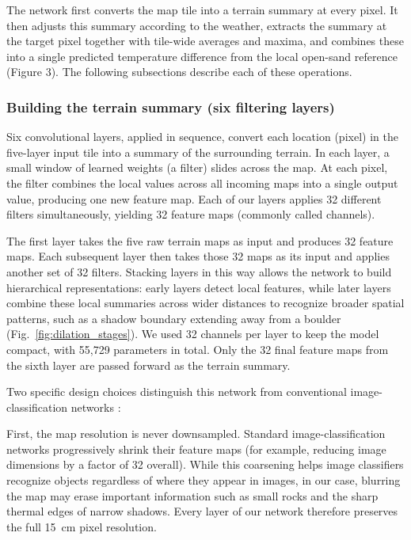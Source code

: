 \documentclass[12pt]{article}
\begin{document}
The network first converts the map tile into a terrain summary at every pixel. It then adjusts this summary according to the weather, extracts the summary at the target pixel together with tile-wide averages and maxima, and combines these into a single predicted temperature difference from the local open-sand reference (Figure 3). The following subsections describe each of these operations.



\subsubsection{Building the terrain summary (six filtering layers)}
\noindent Six convolutional layers, applied in sequence, convert each location (pixel) in the five-layer input tile into a summary of the surrounding terrain. In each layer, a small window of learned weights (a filter) slides across the map. At each pixel, the filter combines the local values across all incoming maps into a single output value, producing one new feature map. Each of our layers applies 32 different filters simultaneously, yielding 32 feature maps (commonly called channels).

The first layer takes the five raw terrain maps as input and produces 32 feature maps. Each subsequent layer then takes those 32 maps as its input and applies another set of 32 filters. Stacking layers in this way allows the network to build hierarchical representations: early layers detect local features, while later layers combine these local summaries across wider distances to recognize broader spatial patterns, such as a shadow boundary extending away from a boulder (Fig.~\ref{fig:dilation_stages}). We used 32 channels per layer to keep the model compact, with 55,729 parameters in total. Only the 32 final feature maps from the sixth layer are passed forward as the terrain summary.

Two specific design choices distinguish this network from conventional image-classification networks \citep{simonyan_2015, he_2016}:

First, the map resolution is never downsampled. Standard image-classification networks progressively shrink their feature maps (for example, reducing image dimensions by a factor of 32 overall). While this coarsening helps image classifiers recognize objects regardless of where they appear in images, in our case, blurring the map may erase important information such as small rocks and the sharp thermal edges of narrow shadows. Every layer of our network therefore preserves the full 15~cm pixel resolution.
\end{document}
